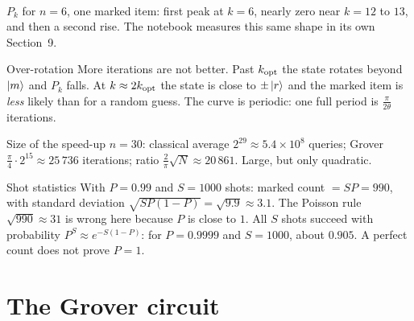\documentclass[11pt,a4paper,openany]{book}
\newcounter{wex}[section]
\newenvironment{keepfig}{\par\noindent\begin{minipage}{\linewidth}\centering}{\end{minipage}\par\medskip}
\newcommand{\kopt}{k_{\rm opt}}
\begin{document}
\begin{keepfig}
\\
{\small $P_k$ for $n = 6$, one marked item: first peak at $k = 6$, nearly zero near $k = 12$ to $13$, and then a second rise. The notebook measures this same shape in its own Section~9.}
\end{keepfig}

\begin{keyres}{Over-rotation}
More iterations are not better. Past $\kopt$ the state rotates beyond $\ket{m}$ and $P_k$ falls. At $k \approx 2\kopt$ the state is close to $\pm\ket{r}$ and the marked item is \emph{less} likely than for a random guess. The curve is periodic: one full period is $\frac{\pi}{2\theta}$ iterations.
\end{keyres}
\begin{wexample}{Size of the speed-up}
$n = 30$: classical average $2^{29} \approx 5.4\times10^8$ queries; Grover $\frac\pi4\cdot2^{15} \approx 25\,736$ iterations; ratio $\frac2\pi\sqrt N \approx 20\,861$. Large, but only quadratic.
\end{wexample}
\begin{wexample}{Shot statistics}
With $P = 0.99$ and $S = 1000$ shots: marked count $= SP = 990$, with standard deviation $\sqrt{SP(1-P)} = \sqrt{9.9} \approx 3.1$. The Poisson rule $\sqrt{990} \approx 31$ is wrong here because $P$ is close to $1$.
All $S$ shots succeed with probability $P^S \approx e^{-S(1-P)}$: for $P = 0.9999$ and $S = 1000$, about $0.905$. A perfect count does not prove $P = 1$.
\end{wexample}

\section{The Grover circuit}
\end{document}
